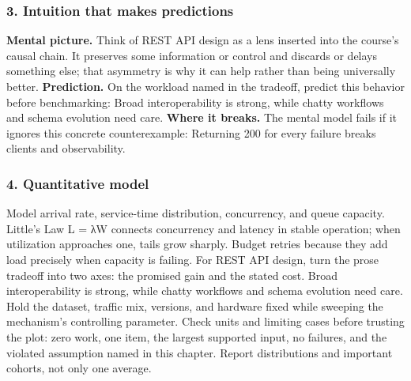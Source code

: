 \subsubsection*{3. Intuition that makes predictions}
\textbf{Mental picture.} Think of REST API design as a lens inserted into the course's causal chain. It preserves some information or control and discards or delays something else; that asymmetry is why it can help rather than being universally better.
\textbf{Prediction.} On the workload named in the tradeoff, predict this behavior before benchmarking: Broad interoperability is strong, while chatty workflows and schema evolution need care.
\textbf{Where it breaks.} The mental model fails if it ignores this concrete counterexample: Returning 200 for every failure breaks clients and observability.
\subsubsection*{4. Quantitative model}
Model arrival rate, service-time distribution, concurrency, and queue capacity. Little's Law L = λW connects concurrency and latency in stable operation; when utilization approaches one, tails grow sharply. Budget retries because they add load precisely when capacity is failing.
For REST API design, turn the prose tradeoff into two axes: the promised gain and the stated cost. Broad interoperability is strong, while chatty workflows and schema evolution need care. Hold the dataset, traffic mix, versions, and hardware fixed while sweeping the mechanism's controlling parameter.
Check units and limiting cases before trusting the plot: zero work, one item, the largest supported input, no failures, and the violated assumption named in this chapter. Report distributions and important cohorts, not only one average.
